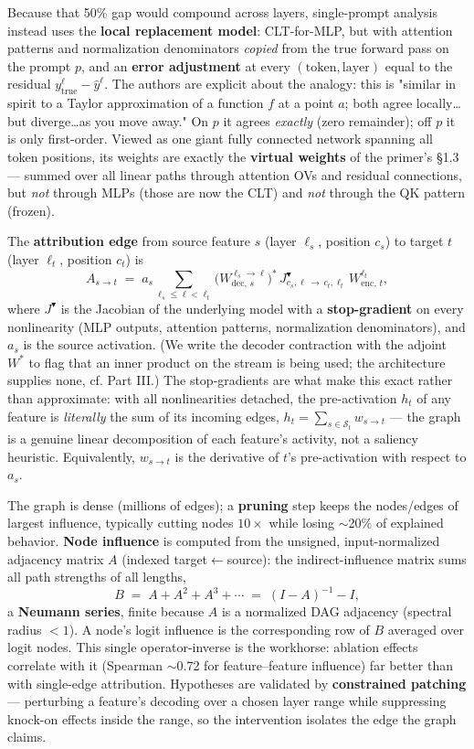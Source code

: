 Because that 50\% gap would compound across layers, single-prompt analysis instead uses the \textbf{local replacement model}: CLT-for-MLP, but with attention patterns and normalization denominators \emph{copied} from the true forward pass on the prompt $p$, and an \textbf{error adjustment} at every $(\text{token},\text{layer})$ equal to the residual $y^{\ell}_{\text{true}}-\hat y^{\ell}$. The authors are explicit about the analogy: this is "similar in spirit to a Taylor approximation of a function $f$ at a point $a$; both agree locally\dots but diverge\dots as you move away." On $p$ it agrees \emph{exactly} (zero remainder); off $p$ it is only first-order. Viewed as one giant fully connected network spanning all token positions, its weights are exactly the \textbf{virtual weights} of the primer's §1.3 --- summed over all linear paths through attention OVs and residual connections, but \emph{not} through MLPs (those are now the CLT) and \emph{not} through the QK pattern (frozen).

The \textbf{attribution edge} from source feature $s$ (layer $\ell_s$, position $c_s$) to target $t$ (layer $\ell_t$, position $c_t$) is
\[
A_{s\to t}
\;=\;
a_s\sum_{\ell_s\le \ell <\ell_t}\big(W_{\text{dec},\,s}^{\ell_s\to\ell}\big)^{*}\,
J^{\blacktriangledown}_{c_s,\ell\,\to\, c_t,\ell_t}\,
W_{\text{enc},\,t}^{\ell_t},
\]
where $J^{\blacktriangledown}$ is the Jacobian of the underlying model with a \textbf{stop-gradient} on every nonlinearity (MLP outputs, attention patterns, normalization denominators), and $a_s$ is the source activation. (We write the decoder contraction with the adjoint $W^{*}$ to flag that an inner product on the stream is being used; the architecture supplies none, cf. Part III.) The stop-gradients are what make this exact rather than approximate: with all nonlinearities detached, the pre-activation $h_t$ of any feature is \emph{literally} the sum of its incoming edges, $h_t=\sum_{s\in\mathcal S_t} w_{s\to t}$ --- the graph is a genuine linear decomposition of each feature's activity, not a saliency heuristic. Equivalently, $w_{s\to t}$ is the derivative of $t$'s pre-activation with respect to $a_s$.

The graph is dense (millions of edges); a \textbf{pruning} step keeps the nodes/edges of largest influence, typically cutting nodes $10\times$ while losing $\sim$20\% of explained behavior. \textbf{Node influence} is computed from the unsigned, input-normalized adjacency matrix $A$ (indexed target$\leftarrow$source): the indirect-influence matrix sums all path strengths of all lengths,
\[
B \;=\; A + A^{2} + A^{3} + \cdots \;=\; (I-A)^{-1} - I,
\]
a \textbf{Neumann series}, finite because $A$ is a normalized DAG adjacency (spectral radius $<1$). A node's logit influence is the corresponding row of $B$ averaged over logit nodes. This single operator-inverse is the workhorse: ablation effects correlate with it (Spearman $\sim$0.72 for feature--feature influence) far better than with single-edge attribution. Hypotheses are validated by \textbf{constrained patching} --- perturbing a feature's decoding over a chosen layer range while suppressing knock-on effects inside the range, so the intervention isolates the edge the graph claims.

